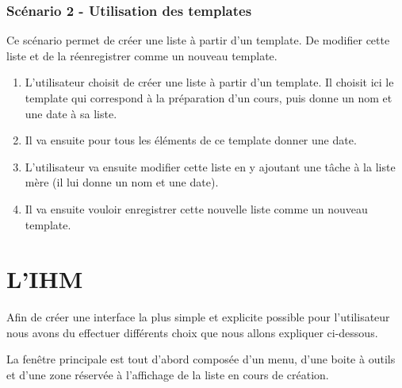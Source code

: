 \documentclass[a4paper,10pt]{article}
\begin{document}
\subsubsection{Scénario 2 - Utilisation des templates}
Ce scénario permet de créer une liste à partir d'un template. De modifier cette liste et de la réenregistrer comme un nouveau template.
\begin{enumerate}
\item{L'utilisateur choisit de créer une liste à partir d'un template. Il choisit ici le template qui correspond à la préparation d'un cours, puis donne un nom et une date à sa liste.}
\item{Il va ensuite pour tous les éléments de ce template donner une date.}
\item{L'utilisateur va ensuite modifier cette liste en y ajoutant une tâche à la liste mère (il lui donne un nom et une date).}
\item{Il va ensuite vouloir enregistrer cette nouvelle liste comme un nouveau template.}
\end{enumerate}


\newpage
\section{L'IHM}

Afin de créer une interface la plus simple et explicite possible pour l'utilisateur nous avons du effectuer différents choix que nous allons expliquer ci-dessous.

La fenêtre principale est tout d'abord composée d'un menu, d'une boite à outils et d'une zone réservée à l'affichage de la liste en cours de création.
\end{document}
